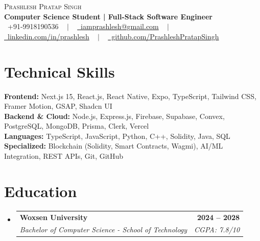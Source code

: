 \documentclass[letterpaper,11pt]{article}
\makeatletter
\newcommand{\resumeSubheading}[4]{
  \vspace{-1pt}\item
    \begin{tabular*}{1.0\textwidth}[t]{l@{\extracolsep{\fill}}r}
      \textbf{#1} & \textbf{\small #2} \\
      \textit{\small#3} & \textit{\small #4} \\
    \end{tabular*}\vspace{-4pt}
}
\newcommand{\resumeSubHeadingListStart}{\begin{itemize}[leftmargin=0.0in, label={}]}
\newcommand{\resumeSubHeadingListEnd}{\end{itemize}}
\makeatother
\begin{document}
\begin{center}
    {\Huge \scshape Prashlesh Pratap Singh} \\ \vspace{1pt}
    \small \textbf{Computer Science Student | Full-Stack Software Engineer} \\ \vspace{8pt}
    \small 
    \raisebox{-0.1\height}\faPhone\ +91-9918190536 ~ $|$ ~ 
    \href{mailto:iamprashlesh@gmail.com}{\raisebox{-0.2\height}\faEnvelope\ iamprashlesh@gmail.com} ~ $|$ ~ 
    \href{https://linkedin.com/in/prashlesh}{\raisebox{-0.2\height}\faLinkedin\ linkedin.com/in/prashlesh} ~ $|$ ~
    \href{https://github.com/PrashleshPratapSingh}{\raisebox{-0.2\height}\faGithub\ github.com/PrashleshPratapSingh}
\end{center}

\section{Technical Skills}
 \begin{itemize}[leftmargin=0.15in, label={}]
    \small{\item{
     \textbf{Frontend:}{ Next.js 15, React.js, React Native, Expo, TypeScript, Tailwind CSS, Framer Motion, GSAP, Shadcn UI} \\
     \textbf{Backend \& Cloud:}{ Node.js, Express.js, Firebase, Supabase, Convex, PostgreSQL, MongoDB, Prisma, Clerk, Vercel} \\
     \textbf{Languages:}{ TypeScript, JavaScript, Python, C++, Solidity, Java, SQL} \\
     \textbf{Specialized:}{ Blockchain (Solidity, Smart Contracts, Wagmi), AI/ML Integration, REST APIs, Git, GitHub} \\
    }}
 \end{itemize}
 \vspace{-12pt}

\section{Education}
  \resumeSubHeadingListStart
    \resumeSubheading
      {Woxsen University}{2024 -- 2028}
      {Bachelor of Computer Science - School of Technology}{CGPA: 7.8/10}
  \resumeSubHeadingListEnd

\end{document}
